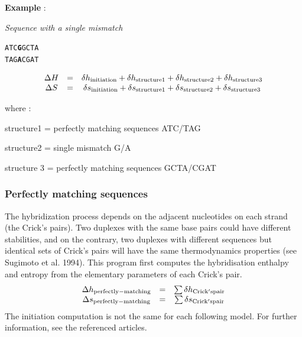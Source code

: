 \documentclass{article}
\begin{document}
\textbf{Example} : 

\textit{Sequence with a single mismatch} 
\begin{alltt}
ATC\textbf{G}GCTA
TAG\textbf{A}CGAT
\end{alltt}
\begin{displaymath}
  \begin{array}[t]{ccc}
  \Delta{}H&=&\delta{}h_\mathrm{initiation}+\delta{}h_\mathrm{structure1}+\delta{}h_\mathrm{structure2}+\delta{}h_\mathrm{structure3}\\
  \Delta{}S&=&\delta{}s_\mathrm{initiation}+\delta{}s_\mathrm{structure1}+\delta{}s_\mathrm{structure2}+\delta{}s_\mathrm{structure3}
  \end{array}
\end{displaymath}

where :

structure1 = perfectly matching sequences ATC/TAG

structure2 = single mismatch G/A

structure 3 = perfectly matching sequences GCTA/CGAT

\subsubsection{Perfectly matching sequences}

The hybridization process depends on the adjacent nucleotides on each strand (the Crick's pairs).  
Two duplexes with the same base pairs could have different stabilities, and on the contrary, two 
duplexes with different sequences but identical sets of Crick's pairs will have the same
thermodynamics properties (see Sugimoto et al. 1994).  This program first computes the hybridisation enthalpy 
and entropy from the elementary parameters of each Crick's pair.
\begin{displaymath}
  \begin{array}[t]{ccc}
  \Delta{}h_\mathrm{perfectly-matching}&=&\sum \delta{}h_\mathrm{Crick's pair}\\
  \Delta{}s_\mathrm{perfectly-matching}&=&\sum \delta{}s_\mathrm{Crick's pair}
  \end{array}
\end{displaymath}
The initiation computation is not the same for each following model. For further information, see the referenced articles.
\end{document}
